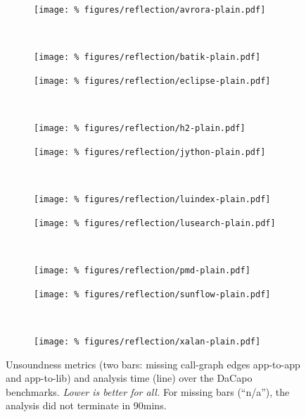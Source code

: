 \begin{figure}
  \begin{subfigure}[t]{0.5\textwidth}
    \centering
    \texttt{[image: \%
      figures/reflection/avrora-plain.pdf]}
  \end{subfigure}
  ~
  \begin{subfigure}[t]{0.5\textwidth}
    \centering
    \texttt{[image: \%
      figures/reflection/batik-plain.pdf]}
  \end{subfigure}

  \begin{subfigure}[t]{0.5\textwidth}
    \centering
    \texttt{[image: \%
      figures/reflection/eclipse-plain.pdf]}
  \end{subfigure}
  ~
  \begin{subfigure}[t]{0.5\textwidth}
    \centering
    \texttt{[image: \%
      figures/reflection/h2-plain.pdf]}
  \end{subfigure}

  \begin{subfigure}[t]{0.5\textwidth}
    \centering
    \texttt{[image: \%
      figures/reflection/jython-plain.pdf]}
  \end{subfigure}
  ~
  \begin{subfigure}[t]{0.5\textwidth}
    \centering
    \texttt{[image: \%
      figures/reflection/luindex-plain.pdf]}
  \end{subfigure}

  \begin{subfigure}[t]{0.5\textwidth}
    \centering
    \texttt{[image: \%
      figures/reflection/lusearch-plain.pdf]}
  \end{subfigure}
  ~
  \begin{subfigure}[t]{0.5\textwidth}
    \centering
    \texttt{[image: \%
      figures/reflection/pmd-plain.pdf]}
  \end{subfigure}
  
  \begin{subfigure}[t]{0.5\textwidth}
    \centering
    \texttt{[image: \%
      figures/reflection/sunflow-plain.pdf]}
  \end{subfigure}
  ~
  \begin{subfigure}[t]{0.5\textwidth}
    \centering
    \texttt{[image: \%
      figures/reflection/xalan-plain.pdf]}
  \end{subfigure}



  \caption{Unsoundness metrics (two bars: missing call-graph edges app-to-app and app-to-lib)
    and analysis time (line) over the DaCapo benchmarks. \emph{Lower
      is better for all.} For missing bars (``n/a''), the analysis did
    not terminate in 90mins.}
  \label{fig:dacapo-bach}
\end{figure}

